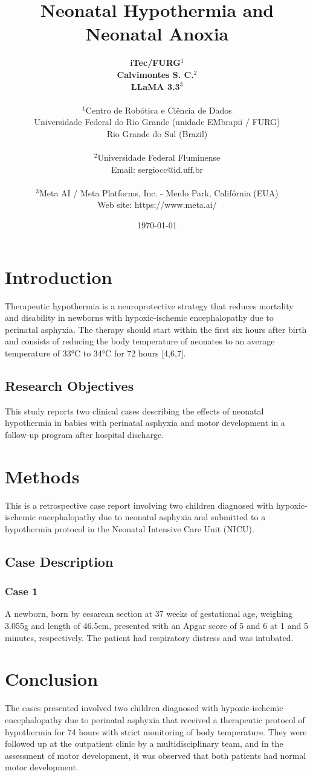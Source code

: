 \documentclass[11pt,a4paper]{article}
\title{\textbf{Neonatal Hypothermia and Neonatal Anoxia}}
\author{
	\textbf{iTec/FURG}$^{1}$ \\
	\textbf{Calvimontes S. C.}$^{2}$ \\
	\textbf{LLaMA 3.3}$^{3}$ \\
	\\
	\small $^{1}$Centro de Robótica e Ciência de Dados \\
	\small Universidade Federal do Rio Grande (unidade EMbrapii / FURG) \\
	\small Rio Grande do Sul (Brazil) \\
	\\
	\small $^{2}$Universidade Federal Fluminense \\
	\small Email: sergiocc@id.uff.br \\
	\\
	\small $^{3}$Meta AI / Meta Platforms, Inc. - Menlo Park, Califórnia (EUA) \\
	\small Web site: https://www.meta.ai/
}
\date{\today}
\begin{document}
	
	\maketitle
	
	\newpage
	
	\section{Introduction}
	Therapeutic hypothermia is a neuroprotective strategy that reduces mortality and disability in newborns with hypoxic-ischemic encephalopathy due to perinatal asphyxia. The therapy should start within the first six hours after birth and consists of reducing the body temperature of neonates to an average temperature of 33°C to 34°C for 72 hours [4,6,7].
		
	\subsection{Research Objectives}
	This study reports two clinical cases describing the effects of neonatal hypothermia in babies with perinatal asphyxia and motor development in a follow-up program after hospital discharge.
	
	\section{Methods}
	This is a retrospective case report involving two children diagnosed with hypoxic-ischemic encephalopathy due to neonatal asphyxia and submitted to a hypothermia protocol in the Neonatal Intensive Care Unit (NICU).
	
	\subsection{Case Description}
	\subsubsection{Case 1}
	A newborn, born by cesarean section at 37 weeks of gestational age, weighing 3.055g and length of 46.5cm, presented with an Apgar score of 5 and 6 at 1 and 5 minutes, respectively. The patient had respiratory distress and was intubated.
		
	\section{Conclusion}
	The cases presented involved two children diagnosed with hypoxic-ischemic encephalopathy due to perinatal asphyxia that received a therapeutic protocol of hypothermia for 74 hours with strict monitoring of body temperature. They were followed up at the outpatient clinic by a multidisciplinary team, and in the assessment of motor development, it was observed that both patients had normal motor development.
	
	\newpage
	
	\printbibliography[title=References]
		
\end{document}
